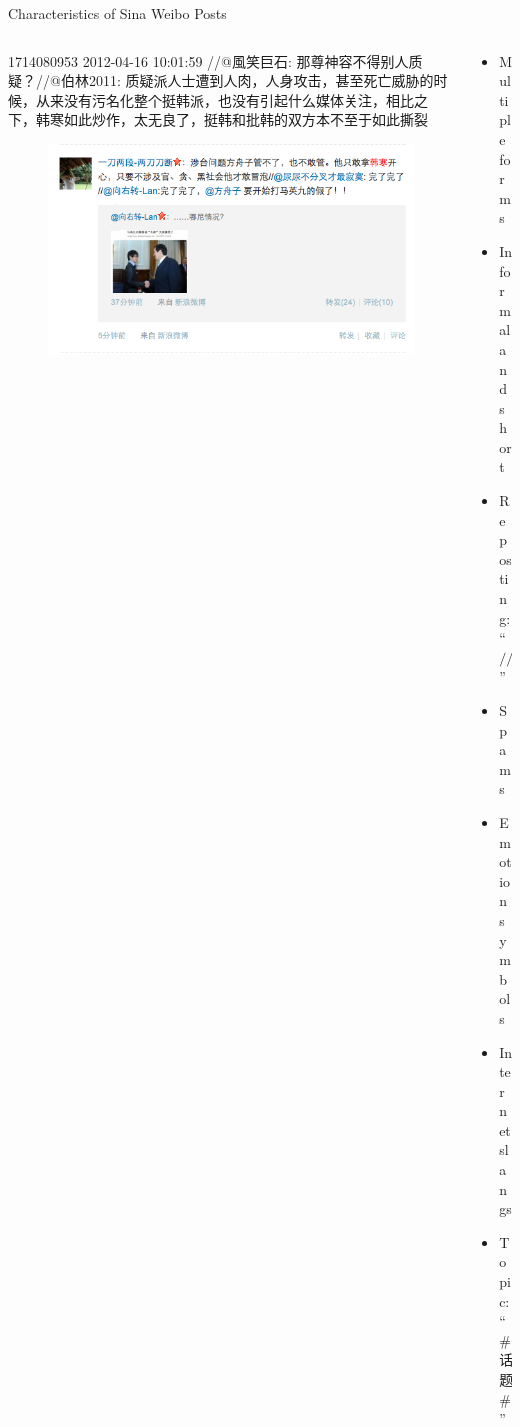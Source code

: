 \documentclass[12pt, trans]{beamer}
\newcommand{\1}[1]{{\mathbf 1}\left\{#1\right\}}        %
\begin{document}
\begin{frame}{Characteristics of Sina Weibo Posts}

 \begin{columns}[t]
 

 \begin{column}{0.6\textwidth}
 
\begin{block}{}
 \tiny
1714080953 2012-04-16 10:01:59 //@風笑巨石: 那尊神容不得别人质疑？//@伯林2011: 
质疑派人士遭到人肉，人身攻击，甚至死亡威胁的时候，从来没有污名化整个挺韩派，也没有引起什么媒体关注，相比之下，韩寒如此炒作，太无良了，挺韩和批韩的双方本不至于如此撕裂
\end{block}

\vspace{-12pt}
\begin{figure}
	  \centering
	  \includegraphics[scale=0.35]{weiboEg.png} 
	\end{figure}
	
	
 \end{column}
 

  \begin{column}{0.4\textwidth}
	\begin{itemize}[<+->]
		\item Multiple forms
		\item Informal and short
		\item Reposting: ``$//@$''
		\item Spams
		\item Emotion symbols 
		\item Internet slangs
		\item Topic: ``\#话题\#''
	\end{itemize}
 \end{column}
 
 \end{columns}




\end{frame}
\end{document}
